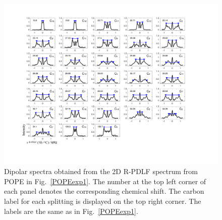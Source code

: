\documentclass[fleqn,10pt]{wlscirepSI}
\begin{document}
\begin{figure}[p]
  \includegraphics[width=\textwidth]{Figures/POPE_slices.pdf}
  \caption{Dipolar spectra obtained from the 2D R-PDLF spectrum from POPE in Fig.~\ref{POPEexp1}. The number at the top left corner of each panel denotes the corresponding chemical shift. The carbon label for each splitting is displayed on the top right corner. The labels are the same as in Fig.~\ref{POPEexp1}.  }
  \label{POPEexp2}
\end{figure}
\end{document}

